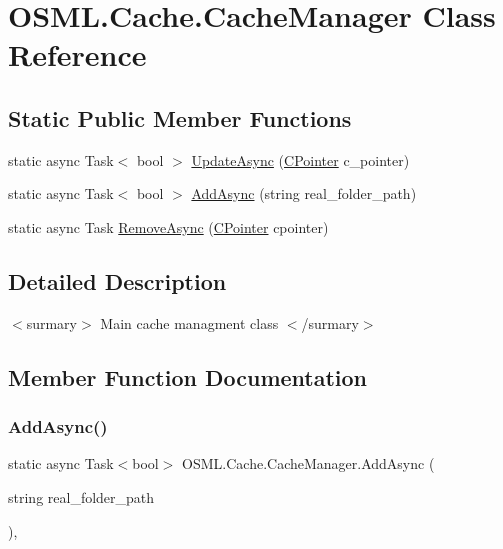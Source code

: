 \hypertarget{classOSML_1_1Cache_1_1CacheManager}{}\section{O\+S\+M\+L.\+Cache.\+Cache\+Manager Class Reference}
\label{classOSML_1_1Cache_1_1CacheManager}
\subsection*{Static Public Member Functions}
\begin{DoxyCompactItemize}
\item 
static async Task$<$ bool $>$ \mbox{\hyperlink{classOSML_1_1Cache_1_1CacheManager_aeb65d11786064f146f115d0f642e96ab}{Update\+Async}} (\mbox{\hyperlink{classOSML_1_1Cache_1_1CPointer}{C\+Pointer}} c\+\_\+pointer)
\item 
static async Task$<$ bool $>$ \mbox{\hyperlink{classOSML_1_1Cache_1_1CacheManager_aad0553e006d717d95fb84515c298581e}{Add\+Async}} (string real\+\_\+folder\+\_\+path)
\item 
static async Task \mbox{\hyperlink{classOSML_1_1Cache_1_1CacheManager_a958c9e18525ae24dc5dd3c3a34a201f6}{Remove\+Async}} (\mbox{\hyperlink{classOSML_1_1Cache_1_1CPointer}{C\+Pointer}} cpointer)
\end{DoxyCompactItemize}


\subsection{Detailed Description}
$<$surmary$>$ Main cache managment class $<$/surmary$>$ 

\subsection{Member Function Documentation}
\mbox{\label{classOSML_1_1Cache_1_1CacheManager_aad0553e006d717d95fb84515c298581e}} 
\subsubsection{\texorpdfstring{AddAsync()}{AddAsync()}}
{\footnotesize\ttfamily static async Task$<$bool$>$ O\+S\+M\+L.\+Cache.\+Cache\+Manager.\+Add\+Async (\begin{DoxyParamCaption}\item[{string}]{real\+\_\+folder\+\_\+path }\end{DoxyParamCaption})\hspace{0.3cm}{\ttfamily [inline]}, {\ttfamily [static]}}

